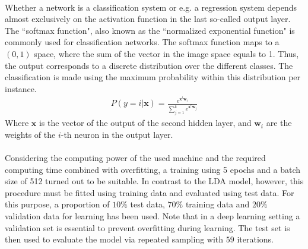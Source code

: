 \documentclass[11pt,a4paper]{article}
\begin{document}
\ \\
Whether a network is a classification system or e.g. a regression system depends almost exclusively on the activation function in the last so-called output layer. The ``softmax function", also known as the ``normalized exponential function" \cite[p. 115]{Bishop2006} is commonly used for  classification networks. The softmax function maps to a $(0,1)$ space, where the sum of the vector in the image space equals to 1. Thus, the output corresponds to a discrete distribution over the different classes. The classification is made using the maximum probability within this distribution per instance.
\begin{align}
	P(y=i|\textbf{x})=\frac{e^{\textbf{x}^t\textbf{w}_i}}{\sum_{j=1}^ke^{\textbf{x}^t\textbf{w}_j}}
\end{align}
Where $\textbf{x}$ is the vector of the output of the second hidden layer, and $\textbf{w}_i$ are the weights of the $i$-th neuron in the output layer.\\
\ \\
Considering the computing power of the used machine and the required computing time combined with overfitting, a training using 5 epochs and a batch size of 512 turned out to be suitable. In contrast to the LDA model, however, this procedure must be fitted using training data and evaluated using test data. For this purpose, a proportion of $10\%$ test data, $70\%$ training data and $20\%$ validation data for learning has been used. Note that in a deep learning setting a validation set is essential to prevent overfitting during learning. The test set is then used to evaluate the model via repeated sampling with $59$ iterations.\\
\end{document}
